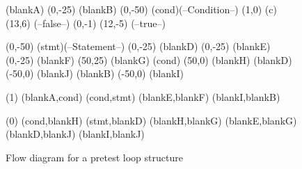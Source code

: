 




\begin {figure}

\Draw

\FcNode(blankA)
\Move(0,-25)
\FcNode(blankB)
\Move(0,-50)
\DiamondNode(cond)(--Condition--)
{ \MoveToExit(1,0) \MarkGLoc(c) \Move(13,6) \Text(--false--) }
{ \MoveToExit(0,-1) \Move(12,-5) \Text(--true--) }

\Move(0,-50)
\RectNode(stmt)(--Statement--)
\Move(0,-25)
\FcNode(blankD)
\Move(0,-25)
\FcNode(blankE)
\Move(0,-25)
\FcNode(blankF)
\Move(50,25)
\FcNode(blankG)
\MoveToLoc(cond)
\Move(50,0)
\FcNode(blankH)
\MoveToLoc(blankD)
\Move(-50,0)
\FcNode(blankJ)
\MoveToLoc(blankB)
\Move(-50,0)
\FcNode(blankI)

\ArrowHeads(1)
\Edge (blankA,cond)
\Edge (cond,stmt)
\Edge (blankE,blankF)
\Edge (blankI,blankB)

\ArrowHeads(0)
\Edge (cond,blankH)
\Edge (stmt,blankD)
\Edge (blankH,blankG)
\Edge (blankE,blankG)
\Edge (blankD,blankJ) 
\Edge (blankI,blankJ) 


\EndDraw


\caption {Flow diagram for a pretest loop structure}

\label {fig:preTestLoop}

\end {figure}


